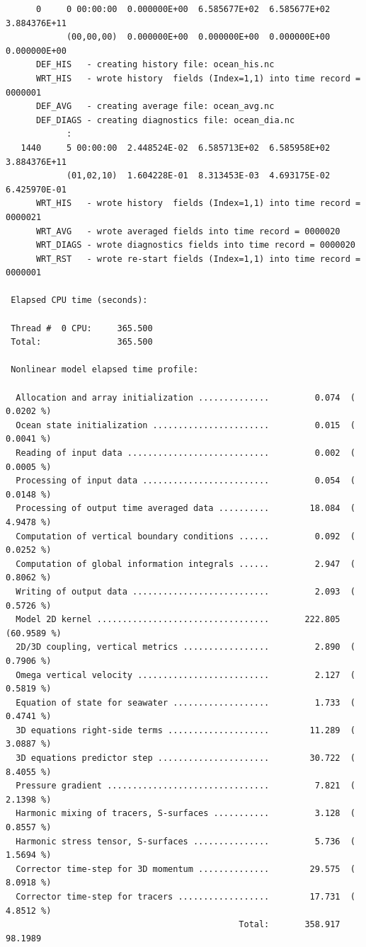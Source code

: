 \begin{verbatim}
      0     0 00:00:00  0.000000E+00  6.585677E+02  6.585677E+02  3.884376E+11
            (00,00,00)  0.000000E+00  0.000000E+00  0.000000E+00  0.000000E+00
      DEF_HIS   - creating history file: ocean_his.nc
      WRT_HIS   - wrote history  fields (Index=1,1) into time record = 0000001
      DEF_AVG   - creating average file: ocean_avg.nc
      DEF_DIAGS - creating diagnostics file: ocean_dia.nc
            :
   1440     5 00:00:00  2.448524E-02  6.585713E+02  6.585958E+02
3.884376E+11
            (01,02,10)  1.604228E-01  8.313453E-03  4.693175E-02
6.425970E-01
      WRT_HIS   - wrote history  fields (Index=1,1) into time record = 0000021
      WRT_AVG   - wrote averaged fields into time record = 0000020
      WRT_DIAGS - wrote diagnostics fields into time record = 0000020
      WRT_RST   - wrote re-start fields (Index=1,1) into time record = 0000001

 Elapsed CPU time (seconds):

 Thread #  0 CPU:     365.500
 Total:               365.500

 Nonlinear model elapsed time profile:

  Allocation and array initialization ..............         0.074  ( 0.0202 %)
  Ocean state initialization .......................         0.015  ( 0.0041 %)
  Reading of input data ............................         0.002  ( 0.0005 %)
  Processing of input data .........................         0.054  ( 0.0148 %)
  Processing of output time averaged data ..........        18.084  ( 4.9478 %)
  Computation of vertical boundary conditions ......         0.092  ( 0.0252 %)
  Computation of global information integrals ......         2.947  ( 0.8062 %)
  Writing of output data ...........................         2.093  ( 0.5726 %)
  Model 2D kernel ..................................       222.805  (60.9589 %)
  2D/3D coupling, vertical metrics .................         2.890  ( 0.7906 %)
  Omega vertical velocity ..........................         2.127  ( 0.5819 %)
  Equation of state for seawater ...................         1.733  ( 0.4741 %)
  3D equations right-side terms ....................        11.289  ( 3.0887 %)
  3D equations predictor step ......................        30.722  ( 8.4055 %)
  Pressure gradient ................................         7.821  ( 2.1398 %)
  Harmonic mixing of tracers, S-surfaces ...........         3.128  ( 0.8557 %)
  Harmonic stress tensor, S-surfaces ...............         5.736  ( 1.5694 %)
  Corrector time-step for 3D momentum ..............        29.575  ( 8.0918 %)
  Corrector time-step for tracers ..................        17.731  ( 4.8512 %)
                                              Total:       358.917   98.1989


\end{verbatim}
